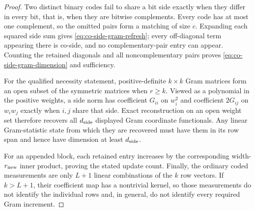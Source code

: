 \begin{proof}
Two distinct binary codes fail to share a bit side exactly when they differ
in every bit, that is, when they are bitwise complements.  Every code has at
most one complement, so the omitted pairs form a matching of size $c$.
Expanding each squared side sum gives
\cref{eq:co-side-gram-refresh}; every off-diagonal term appearing there is
co-side, and no complementary-pair entry can appear.  Counting the retained
diagonals and all noncomplementary pairs proves
\cref{eq:co-side-gram-dimension} and sufficiency.

For the qualified necessity statement, positive-definite $k\times k$ Gram
matrices form an open subset of the symmetric matrices when $r\geq k$.
Viewed as a polynomial in the positive weights, a side norm has coefficient
$G_{ii}$ on $w_i^2$ and coefficient $2G_{ij}$ on $w_iw_j$ exactly when
$i,j$ share that side.  Exact reconstruction on an open weight set therefore
recovers all $d_{\rm side}$ displayed Gram coordinate functionals.  Any
linear Gram-statistic state from which they are recovered must have them in
its row span and hence have dimension at least $d_{\rm side}$.

For an appended block, each retained entry increases by the corresponding
width-$r_{\rm new}$ inner product, proving the stated update count.  Finally,
the ordinary coded measurements are only $L+1$ linear combinations of the
$k$ row vectors.  If $k>L+1$, their coefficient map has a nontrivial kernel,
so those measurements do not identify the individual rows and, in general,
do not identify every required Gram increment.
\end{proof}

